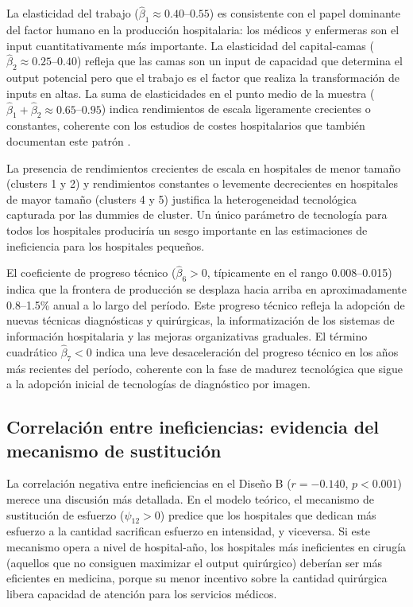 \documentclass[12pt, a4paper, twoside, openright]{book}
\theoremstyle{plain}
\theoremstyle{definition}
\theoremstyle{remark}
\begin{document}
La elasticidad del trabajo ($\hat{\beta}_1 \approx 0.40$--$0.55$) es consistente con el papel dominante del factor humano en la producción hospitalaria: los médicos y enfermeras son el input cuantitativamente más importante. La elasticidad del capital-camas ($\hat{\beta}_2 \approx 0.25$--$0.40$) refleja que las camas son un input de capacidad que determina el output potencial pero que el trabajo es el factor que realiza la transformación de inputs en altas. La suma de elasticidades en el punto medio de la muestra ($\hat{\beta}_1 + \hat{\beta}_2 \approx 0.65$--$0.95$) indica rendimientos de escala ligeramente crecientes o constantes, coherente con los estudios de costes hospitalarios que también documentan este patrón \citep{linna1998,farsi2005}.

La presencia de rendimientos crecientes de escala en hospitales de menor tamaño (clusters 1 y 2) y rendimientos constantes o levemente decrecientes en hospitales de mayor tamaño (clusters 4 y 5) justifica la heterogeneidad tecnológica capturada por las dummies de cluster. Un único parámetro de tecnología para todos los hospitales produciría un sesgo importante en las estimaciones de ineficiencia para los hospitales pequeños.

El coeficiente de progreso técnico ($\hat{\beta}_6 > 0$, típicamente en el rango 0.008--0.015) indica que la frontera de producción se desplaza hacia arriba en aproximadamente 0.8--1.5\% anual a lo largo del período. Este progreso técnico refleja la adopción de nuevas técnicas diagnósticas y quirúrgicas, la informatización de los sistemas de información hospitalaria y las mejoras organizativas graduales. El término cuadrático $\hat{\beta}_7 < 0$ indica una leve desaceleración del progreso técnico en los años más recientes del período, coherente con la fase de madurez tecnológica que sigue a la adopción inicial de tecnologías de diagnóstico por imagen.

\subsection{Correlación entre ineficiencias: evidencia del mecanismo de sustitución}

La correlación negativa entre ineficiencias en el Diseño B ($r=-0.140$, $p<0.001$) merece una discusión más detallada. En el modelo teórico, el mecanismo de sustitución de esfuerzo ($\psi_{12}>0$) predice que los hospitales que dedican más esfuerzo a la cantidad sacrifican esfuerzo en intensidad, y viceversa. Si este mecanismo opera a nivel de hospital-año, los hospitales más ineficientes en cirugía (aquellos que no consiguen maximizar el output quirúrgico) deberían ser más eficientes en medicina, porque su menor incentivo sobre la cantidad quirúrgica libera capacidad de atención para los servicios médicos.
\end{document}
